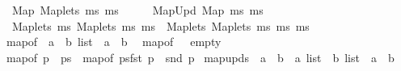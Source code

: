 \begin{isabellebody}
\ \ {\isachardoublequoteopen}{\isacharunderscore}{\kern0pt}Map\ {\isacharparenleft}{\kern0pt}{\isacharunderscore}{\kern0pt}Maplets\ ms{}\ ms{}{\isacharparenright}{\kern0pt}{\isachardoublequoteclose}\ \ \ \ \ {\isasymleftharpoondown}\ {\isachardoublequoteopen}{\isacharunderscore}{\kern0pt}MapUpd\ {\isacharparenleft}{\kern0pt}{\isacharunderscore}{\kern0pt}Map\ ms{}{\isacharparenright}{\kern0pt}\ ms{}{\isachardoublequoteclose}\isanewline
\ \ {\isachardoublequoteopen}{\isacharunderscore}{\kern0pt}Maplets\ ms{}\ {\isacharparenleft}{\kern0pt}{\isacharunderscore}{\kern0pt}Maplets\ ms{}\ ms{}{\isacharparenright}{\kern0pt}{\isachardoublequoteclose}\ {\isasymleftharpoondown}\ {\isachardoublequoteopen}{\isacharunderscore}{\kern0pt}Maplets\ {\isacharparenleft}{\kern0pt}{\isacharunderscore}{\kern0pt}Maplets\ ms{}\ ms{}{\isacharparenright}{\kern0pt}\ ms{}{\isachardoublequoteclose}\isanewline
\isanewline
{}\isamarkupfalse%
\ map{\isacharunderscore}{\kern0pt}of\ {\isacharcolon}{\kern0pt}{\isacharcolon}{\kern0pt}\ {\isachardoublequoteopen}{\isacharparenleft}{\kern0pt}{\isacharprime}{\kern0pt}a\ {\isasymtimes}\ {\isacharprime}{\kern0pt}b{\isacharparenright}{\kern0pt}\ list\ {\isasymRightarrow}\ {\isacharprime}{\kern0pt}a\ {\isasymrightharpoonup}\ {\isacharprime}{\kern0pt}b{\isachardoublequoteclose}\isanewline
{}\isanewline
\ \ {\isachardoublequoteopen}map{\isacharunderscore}{\kern0pt}of\ {\isacharbrackleft}{\kern0pt}{\isacharbrackright}{\kern0pt}\ {\isacharequal}{\kern0pt}\ empty{\isachardoublequoteclose}\isanewline
{\isacharbar}{\kern0pt}\ {\isachardoublequoteopen}map{\isacharunderscore}{\kern0pt}of\ {\isacharparenleft}{\kern0pt}p\ {\isacharhash}{\kern0pt}\ ps{\isacharparenright}{\kern0pt}\ {\isacharequal}{\kern0pt}\ {\isacharparenleft}{\kern0pt}map{\isacharunderscore}{\kern0pt}of\ ps{\isacharparenright}{\kern0pt}{\isacharparenleft}{\kern0pt}fst\ p\ {\isasymmapsto}\ snd\ p{\isacharparenright}{\kern0pt}{\isachardoublequoteclose}\isanewline
\isanewline
{}\isamarkupfalse%
\ map{\isacharunderscore}{\kern0pt}upds\ {\isacharcolon}{\kern0pt}{\isacharcolon}{\kern0pt}\ {\isachardoublequoteopen}{\isacharparenleft}{\kern0pt}{\isacharprime}{\kern0pt}a\ {\isasymrightharpoonup}\ {\isacharprime}{\kern0pt}b{\isacharparenright}{\kern0pt}\ {\isasymRightarrow}\ {\isacharprime}{\kern0pt}a\ list\ {\isasymRightarrow}\ {\isacharprime}{\kern0pt}b\ list\ {\isasymRightarrow}\ {\isacharprime}{\kern0pt}a\ {\isasymrightharpoonup}\ {\isacharprime}{\kern0pt}b{\isachardoublequoteclose}\isanewline

\end{isabellebody}
